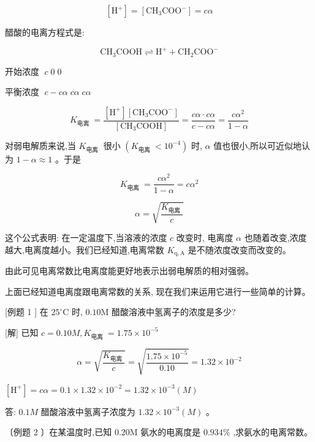 \documentclass[10pt]{article}
\begin{document}
\[
\left\lbrack {\mathrm{H}}^{ + }\right\rbrack = \left\lbrack {{\mathrm{{CH}}}_{3}{\mathrm{{COO}}}^{ - }}\right\rbrack = {c\alpha }
\]

醋酸的电离方程式是:

\[
{\mathrm{{CH}}}_{3}\mathrm{{COOH}} \rightleftharpoons {\mathrm{H}}^{ + } + {\mathrm{{CH}}}_{2}{\mathrm{{COO}}}^{ - }
\]

开始浓度 \(\;c\;0\;0\)

平衡浓度 \(\;c - {c\alpha }\;{c\alpha }\;{c\alpha }\)

\[
{K}_{\text{电离 }} = \frac{\left\lbrack {\mathrm{H}}^{ + }\right\rbrack \left\lbrack {{\mathrm{{CH}}}_{3}{\mathrm{{COO}}}^{ - }}\right\rbrack }{\left\lbrack {\mathrm{{CH}}}_{3}\mathrm{{COOH}}\right\rbrack } = \frac{{c\alpha } \cdot {c\alpha }}{c - {c\alpha }} = \frac{c{\alpha }^{2}}{1 - \alpha }
\]

对弱电解质来说,当 \({K}_{\text{电离 }}\) 很小 \(\left( {{K}_{\text{电离 }} < {10}^{-4}}\right)\) 时, \(\alpha\) 值也很小,所以可近似地认为 \(1 - \alpha \approx 1\) 。于是

\[
{K}_{\text{电离 }} = \frac{c{\alpha }^{2}}{1 - \alpha } = c{\alpha }^{2}
\]

\[
\alpha = \sqrt{\frac{{K}_{\text{电离 }}}{c}}
\]

这个公式表明: 在一定温度下,当溶液的浓度 \(c\) 改变时, 电离度 \(\alpha\) 也随着改变,浓度越大,电离度越小。我们已经知道,电离常数 \({K}_{\mathrm{q},\mathrm{A}}\) 是不随浓度改变而改变的。

由此可见电离常数比电离度能更好地表示出弱电解质的相对强弱。

上面已经知道电离度跟电离常数的关系, 现在我们来运用它进行一些简单的计算。

[例题 1 ] 在 \({25}^{ \circ }\mathrm{C}\) 时, \({0.10}\mathrm{M}\) 醋酸溶液中氢离子的浓度是多少?

[解] 已知 \(c = {0.10M},{K}_{\text{电离 }} = {1.75} \times {10}^{-5}\)

\[
\alpha = \sqrt{\frac{{K}_{\text{电离 }}}{c}} = \sqrt{\frac{{1.75} \times {10}^{-5}}{0.10}} = {1.32} \times {10}^{-2}
\]

\(\left\lbrack {\mathrm{H}}^{ + }\right\rbrack = {c\alpha } = {0.1} \times {1.32} \times {10}^{-2} = {1.32} \times {10}^{-3}\left( M\right)\)

答: \({0.1M}\) 醋酸溶液中氢离子浓度为 \({1.32} \times {10}^{-3}\left( M\right)\) 。

〔例题 2 〕在某温度时,已知 \({0.20}\mathrm{M}\) 氨水的电离度是 \({0.934}\%\) ,求氨水的电离常数。
\end{document}

